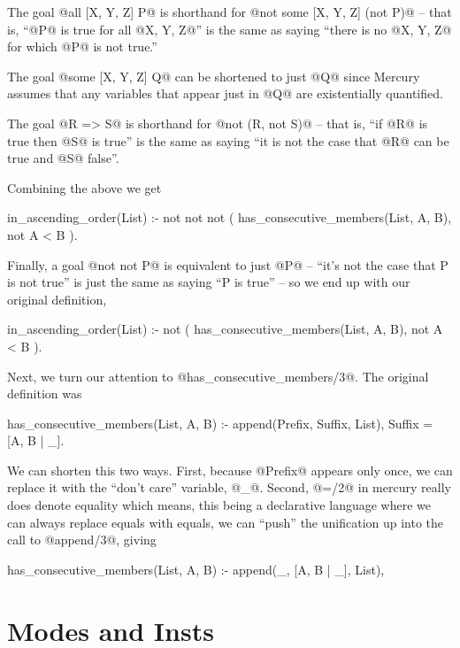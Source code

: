 The goal @all [X, Y, Z] P@ is shorthand for
@not some [X, Y, Z] (not P)@ -- that is, ``@P@ is true for all
@X, Y, Z@'' is the same as saying ``there is no @X, Y, Z@ for which @P@
is not true.''

The goal @some [X, Y, Z] Q@ can be shortened to just @Q@ since Mercury
assumes that any variables that appear just in @Q@ are existentially
quantified.  

The goal @R => S@ is shorthand for @not (R, not S)@ -- that is,
``if @R@ is true then @S@ is true'' is the same as saying ``it is not
the case that @R@ can be true and @S@ false''.

Combining the above we get
\begin{myverbatim}
in_ascending_order(List) :-
    not not not (
        has_consecutive_members(List, A, B),
        not A < B
    ).
\end{myverbatim}
Finally, a goal @not not P@ is equivalent to just @P@ -- ``it's not the
case that P is not true'' is just the same as saying ``P is true'' -- so
we end up with our original definition,
\begin{myverbatim}
in_ascending_order(List) :-
    not (
        has_consecutive_members(List, A, B),
        not A < B
    ).
\end{myverbatim}

Next, we turn our attention to @has_consecutive_members/3@.  The
original definition was
\begin{myverbatim}
has_consecutive_members(List, A, B) :-
    append(Prefix, Suffix, List),
    Suffix = [A, B | _].
\end{myverbatim}
We can shorten this two ways.  First, because @Prefix@ appears only once,
we can replace it with the ``don't care'' variable, @_@.  Second, @=/2@ in
mercury really does denote equality which means, this being a declarative
language where we can always replace equals with equals, we can ``push''
the unification up into the call to @append/3@, giving
\begin{myverbatim}
has_consecutive_members(List, A, B) :-
    append(_, [A, B | _], List),
\end{myverbatim}

\section{Modes and Insts}


